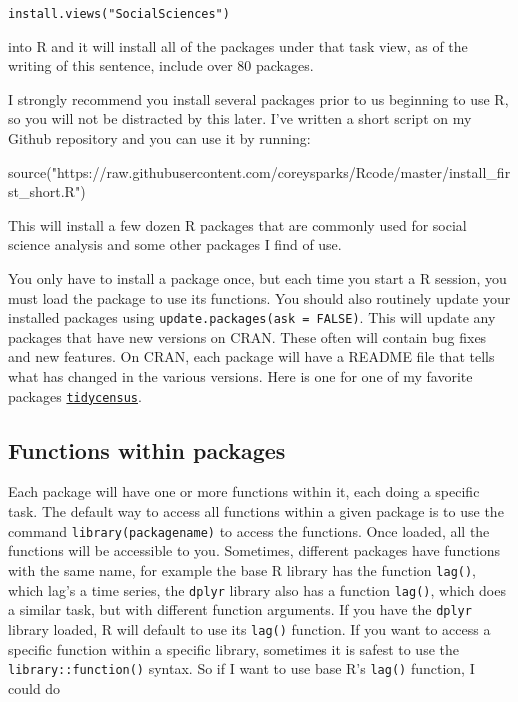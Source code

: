 \documentclass[
]{book}
\newenvironment{Shaded}{\begin{snugshade}}{\end{snugshade}}
\newcommand{\FunctionTok}[1]{\textcolor[rgb]{0.00,0.00,0.00}{#1}}
\newcommand{\NormalTok}[1]{#1}
\newcommand{\StringTok}[1]{\textcolor[rgb]{0.31,0.60,0.02}{#1}}
\begin{document}
\texttt{install.views("SocialSciences")}

into R and it will install all of the packages under that task view, as
of the writing of this sentence, include over 80 packages.

I strongly recommend you install several packages prior to us beginning
to use R, so you will not be distracted by this later. I've written a
short script on my Github repository and you can use it by running:

\begin{Shaded}
\begin{Highlighting}[]
\FunctionTok{source}\NormalTok{(}\StringTok{"https://raw.githubusercontent.com/coreysparks/Rcode/master/install\_first\_short.R"}\NormalTok{)}
\end{Highlighting}
\end{Shaded}

This will install a few dozen R packages that are commonly used for
social science analysis and some other packages I find of use.

You only have to install a package once, but each time you start a R
session, you must load the package to use its functions. You should also
routinely update your installed packages using
\texttt{update.packages(ask\ =\ FALSE)}. This will update any packages that have
new versions on CRAN. These often will contain bug fixes and new
features. On CRAN, each package will have a README file that tells what
has changed in the various versions. Here is one for one of my favorite
packages
\href{https://cran.r-project.org/web/packages/tidycensus/readme/README.html}{\texttt{tidycensus}}.

\hypertarget{functions-within-packages}{%
\subsection{Functions within packages}\label{functions-within-packages}}

Each package will have one or more functions within it, each doing a
specific task. The default way to access all functions within a given
package is to use the command \texttt{library(packagename)} to access the
functions. Once loaded, all the functions will be accessible to you.
Sometimes, different packages have functions with the same name, for
example the base R library has the function \texttt{lag()}, which lag's a time
series, the \texttt{dplyr} library also has a function \texttt{lag()}, which does a
similar task, but with different function arguments. If you have the
\texttt{dplyr} library loaded, R will default to use its \texttt{lag()} function. If
you want to access a specific function within a specific library,
sometimes it is safest to use the \texttt{library::function()} syntax. So if I
want to use base R's \texttt{lag()} function, I could do
\end{document}
